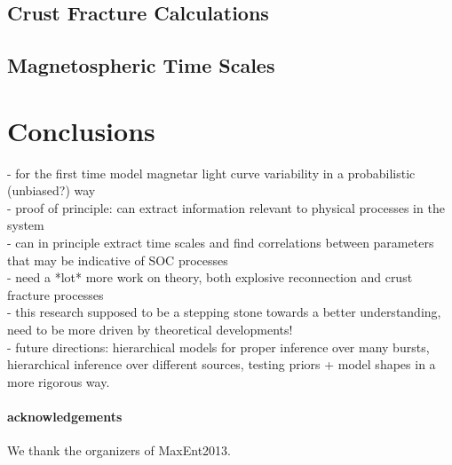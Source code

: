 \documentclass[12pt]{emulateapj}
\begin{document}
\subsection{Crust Fracture Calculations}


\subsection{Magnetospheric Time Scales}


\section{Conclusions}

- for the first time model magnetar light curve variability in a probabilistic (unbiased?) way \\
- proof of principle: can extract information relevant to physical processes in the system \\
- can in principle extract time scales and find correlations between parameters that may be
indicative of SOC processes \\
- need a *lot* more work on theory, both explosive reconnection and crust fracture processes \\
- this research supposed to be a stepping stone towards a better understanding, need to be
more driven by theoretical developments! \\
- future directions: hierarchical models for proper inference over many bursts, hierarchical inference
over different sources, testing priors + model shapes in a more rigorous way.


\paragraph{acknowledgements}
We thank the organizers of MaxEnt2013.




\end{document}
